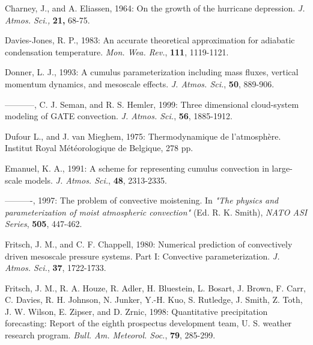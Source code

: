 
\por
Charney, J., and A. Eliassen, 1964: On the growth of the hurricane
depression. {\it J. Atmos. Sci.,} {\bf 21,} 68-75.


\por
Davies-Jones, R. P., 1983: An accurate theoretical approximation for
adiabatic condensation temperature. {\it Mon. Wea. Rev.},
{\bf 111}, 1119-1121.

\por
Donner, L. J., 1993: A cumulus parameterization including mass fluxes,
vertical momentum dynamics, and mesoscale effects.
{\it J. Atmos. Sci.}, {\bf 50}, 889-906.

\por
-----------, C. J. Seman, and R. S. Hemler, 1999: Three dimensional cloud-system
modeling of GATE convection. {\it J. Atmos. Sci.}, {\bf 56}, 1885-1912.

\por
Dufour L., and J. van Mieghem, 1975: Thermodynamique de
l'atmosph\`ere. Institut Royal M\'et\'eorologique de Belgique, 278 pp.

\por
Emanuel, K. A., 1991: A scheme for representing cumulus convection in
large-scale models. {\it J. Atmos. Sci.}, {\bf 48}, 2313-2335.

\por
----------, 1997:
The problem of convective moistening.
In {\it "The physics and parameterization of moist atmospheric convection"}
(Ed. R. K. Smith), {\it NATO ASI Series}, {\bf 505}, 447-462.
%

\por
Fritsch, J. M., and C. F. Chappell, 1980: Numerical prediction of
convectively driven mesoscale pressure systems. Part I:
Convective parameterization. {\it J. Atmos. Sci.}, {\bf 37}, 1722-1733.

\por
Fritsch, J. M., R. A. Houze, R. Adler, H. Bluestein, L. Bosart,
J. Brown, F. Carr, C. Davies, R. H. Johnson, N. Junker, Y.-H. Kuo,
S. Rutledge, J. Smith, Z. Toth, J. W. Wilson, E. Zipser, and D. Zrnic, 1998:
Quantitative precipitation forecasting: Report of the eighth prospectus
development team, U. S. weather research program.
{\it Bull. Am. Meteorol. Soc.}, {\bf 79}, 285-299.


